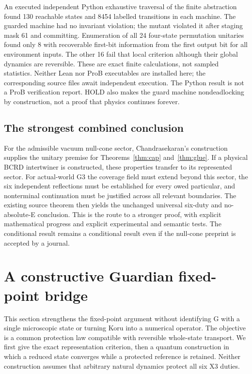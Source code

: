 \documentclass[11pt,a4paper]{article}
\begin{document}
An executed independent Python exhaustive traversal of the finite abstraction found 130 reachable states and 8454 labelled transitions in each machine. The guarded machine had no invariant violation; the mutant violated it after staging mask 61 and committing. Enumeration of all 24 four-state permutation unitaries found only 8 with recoverable first-bit information from the first output bit for all environment inputs. The other 16 fail that local criterion although their global dynamics are reversible. These are exact finite calculations, not sampled statistics. Neither Lean nor ProB executables are installed here; the corresponding source files await independent execution. The Python result is not a ProB verification report. HOLD also makes the guard machine nondeadlocking by construction, not a proof that physics continues forever.

\subsection{The strongest combined conclusion}
For the admissible vacuum null-cone sector, Chandrasekaran's construction supplies the unitary premise for Theorems~\ref{thm:cap} and~\ref{thm:glue}. If a physical BCRD intertwiner is constructed, these properties transfer to its represented sector. For actual-world G3 the coverage field must extend beyond this sector, the six independent reflections must be established for every owed particular, and nonterminal continuation must be justified across all relevant boundaries. The existing source theorem then yields the unchanged universal six-duty and no-absolute-E conclusion. This is the route to a stronger proof, with explicit mathematical progress and explicit experimental and semantic tests. The conditional result remains a conditional result even if the null-cone preprint is accepted by a journal.

\section{A constructive Guardian fixed-point bridge}\label{sec:guardianconstructive}
This section strengthens the fixed-point argument without identifying G with a single microscopic state or turning Koru into a numerical operator. The objective is a common protection law compatible with reversible whole-state transport. We first give the exact representation criterion, then a quantum construction in which a reduced state converges while a protected reference is retained. Neither construction assumes that arbitrary natural dynamics protect all six X3 duties.
\end{document}
